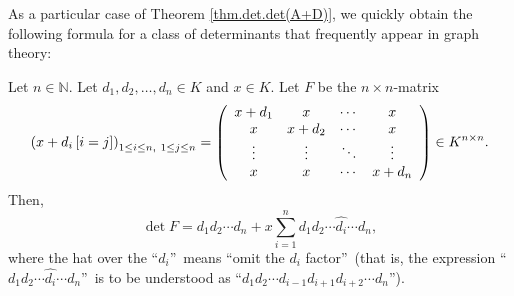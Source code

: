As a particular case of Theorem \ref{thm.det.det(A+D)}, we quickly obtain the
following formula for a class of determinants that frequently appear in graph theory:

\begin{proposition}
\label{prop.det.x+ai}Let $n\in\mathbb{N}$. Let $d_{1},d_{2},\ldots,d_{n}\in K$
and $x\in K$. Let $F$ be the $n\times n$-matrix
\[
\left(  x+d_{i}\left[  i=j\right]  \right)  _{1\leq i\leq n,\ 1\leq j\leq
n}=\left(
\begin{array}
[c]{cccc}%
x+d_{1} & x & \cdots & x\\
x & x+d_{2} & \cdots & x\\
\vdots & \vdots & \ddots & \vdots\\
x & x & \cdots & x+d_{n}%
\end{array}
\right)  \in K^{n\times n}.
\]
Then,%
\[
\det F=d_{1}d_{2}\cdots d_{n}+x\sum_{i=1}^{n}d_{1}d_{2}\cdots\widehat{d_{i}%
}\cdots d_{n},
\]
where the hat over the \textquotedblleft$d_{i}$\textquotedblright\ means
\textquotedblleft omit the $d_{i}$ factor\textquotedblright\ (that is, the
expression \textquotedblleft$d_{1}d_{2}\cdots\widehat{d_{i}}\cdots d_{n}%
$\textquotedblright\ is to be understood as \textquotedblleft$d_{1}d_{2}\cdots
d_{i-1}d_{i+1}d_{i+2}\cdots d_{n}$\textquotedblright).
\end{proposition}

